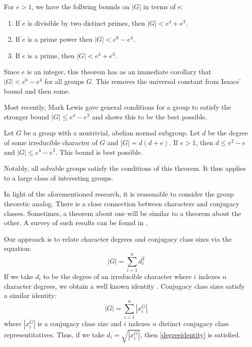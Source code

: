 \documentclass[main.tex]{subfiles}
\begin{document}
\hss

\begin{theorem}
For $e > 1$, we have the follwing bounds on $|G|$ in terms of $e$:
\begin{enumerate}
	\item If $e$ is divisible by two distinct primes, then $|G| < e^4 + e^3$.
	\item If $e$ is a prime power then $|G| < e^6 - e^4$.
	\item If $e$ is a prime, then $|G| < e^4 + e^3$.
\end{enumerate}
\end{theorem}

\hss

\noindent Since $e$ is an integer, this theorem has as an immediate corollary that $|G| < e^6 - e^4$ for all groups $G$. This removes the universal constant from Isaacs' bound and then some.

Most recently, Mark Lewis gave general conditions \cite{lewisarticle} for a group to satisfy the stronger bound $|G| \le e^4 - e^3$ and shows this to be the best possible.

\hss

\begin{theorem} Let $G$ be a group with a nontrivial, abelian normal subgroup. Let $d$ be the degree of some irreducible character of $G$ and $|G| = d(d+e)$. If $e > 1$, then $d \le e^2 - e$ and $|G| \le e^4 - e^3$. This bound is best possible.
\end{theorem}

\hss

\noindent Notably, all solvable groups satisfy the conditions of this theorem. It thus applies to a large class of interesting groups.

In light of the aforementioned research, it is reasonable to consider the group theoretic analog. There is a close connection between characters and conjugacy classes. Sometimes, a theorem about one will be similar to a theorem about the other. A survey of such results can be found in \cite{larsenmalletieparticle}.

Our approach is to relate character degrees and conjugacy class sizes via the equation:
\begin{equation}\label{degreeidentity}
|G| = \sum_{i=1}^n d_i^2
\end{equation}
If we take $d_i$ to be the degree of an irreducible character where $i$ indexes $n$ character degrees, we obtain a well known identity \cite{gorensteinfinitegroups}. Conjugacy class sizes satisfy a similar identity:
\begin{equation*}
|G| = \sum_{i=1}^n |x_i^G|
\end{equation*}
where $|x_i^G|$ is a conjugacy class size and $i$ indexes $n$ distinct conjugacy class representitatives. Thus, if we take $d_i = \sqrt{|x_i^G|}$, then \ref{degreeidentity} is satisfied.
\end{document}
